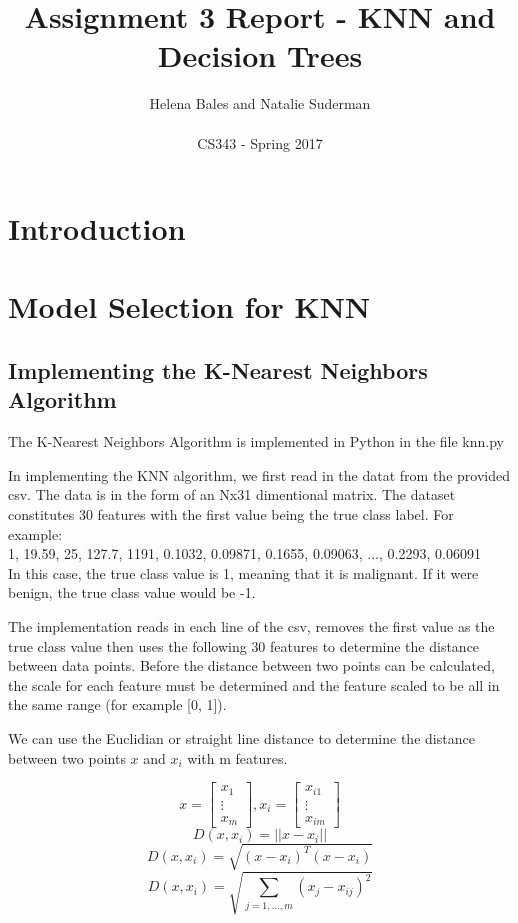 \documentclass[letterpaper,10pt]{article}
\title{Assignment 3 Report - KNN and Decision Trees}
\author{Helena Bales and Natalie Suderman\\ \\ CS343 - Spring 2017}
\begin{document}
\maketitle

\tableofcontents
\clearpage

\section{Introduction}

\section{Model Selection for KNN}

\subsection{Implementing the K-Nearest Neighbors Algorithm}
The K-Nearest Neighbors Algorithm is implemented in Python in the file knn.py

In implementing the KNN algorithm, we first read in the datat from the provided csv. The data is 
in the form of an Nx31 dimentional matrix. The dataset constitutes 30 features with the first 
value being the true class label. For example:\\

1, 19.59, 25, 127.7, 1191, 0.1032, 0.09871, 0.1655, 0.09063, ..., 0.2293, 0.06091\\

In this case, the true class value is 1, meaning that it is malignant. If it were benign, the true
 class value would be -1.

The implementation reads in each line of the csv, removes the first value as the true class value 
then uses the following 30 features to determine the distance between data points. Before the 
distance between two points can be calculated, the scale for each feature must be determined and 
the feature scaled to be all in the same range (for example [0, 1]).

We can use the Euclidian or straight line distance to determine the distance between two points 
\(x\) and \(x_i\) with m features.

\[ x = \left[ \begin{array}{c} x_1 \\ \vdots \\ x_m \end{array} \right], x_i = \left[ \begin{array}{c} x_{i1} \\ \vdots \\ x_{im} \end{array} \right] \]
\[ D(x,x_i) = ||x - x_i|| \]
\[ D(x,x_i) = \sqrt{(x - x_i)^T(x - x_i)} \]
\[ D(x,x_i) = \sqrt{\sum_{j=1,...,m} (x_j - x_{ij})^2} \]
\end{document}
